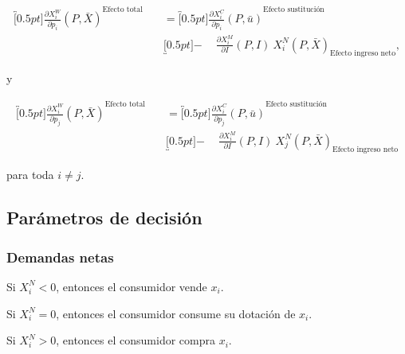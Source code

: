 \documentclass[8pt,a4paper]{extarticle}
\begin{document}
\begin{multicols}{3}
\begin{boxtheo}
		\begin{equation*}
			\begin{aligned}
				\overbracket[0.5pt]{\frac{\partial X^W_i}{\partial p_i} (P, \bar{X})}^{\text{Efecto total}} \quad & = \overbracket[0.5pt]{\frac{\partial X^C_i}{\partial p_i} (P, \bar{u})}^{\text{Efecto sustitución}}                       \\
				                                                                                                  & \underbracket[0.5pt]{ - \quad\ \frac{\partial X_i^M}{\partial I} (P, I)\ X^N_i (P,\bar{X})}_{\text{Efecto ingreso neto}},
			\end{aligned}
		\end{equation*}

		y

		\begin{equation*}
			\begin{aligned}
				\overbracket[0.5pt]{\frac{\partial X^W_i}{\partial p_j} (P, \bar{X})}^{\text{Efecto total}} \quad & = \overbracket[0.5pt]{\frac{\partial X^C_i}{\partial p_j} (P, \bar{u})}^{\text{Efecto sustitución}}                      \\
				                                                                                                  & \underbracket[0.5pt]{ - \quad\ \frac{\partial X_i^M}{\partial I} (P, I)\ X^N_j (P,\bar{X})}_{\text{Efecto ingreso neto}}
			\end{aligned}
		\end{equation*}

		para toda $i \neq j$.
	\end{boxtheo}

	\subsection{Parámetros de decisión}

	\subsubsection*{Demandas netas}

	\begin{eqlist}
		\item Si $X_i^N < 0$, entonces el consumidor vende $x_i$.
		\item Si $X_i^N = 0$, entonces el consumidor consume su dotación de $x_i$.
		\item Si $X_i^N > 0$, entonces el consumidor compra $x_i$.
	\end{eqlist}


\end{multicols}
\end{document}
